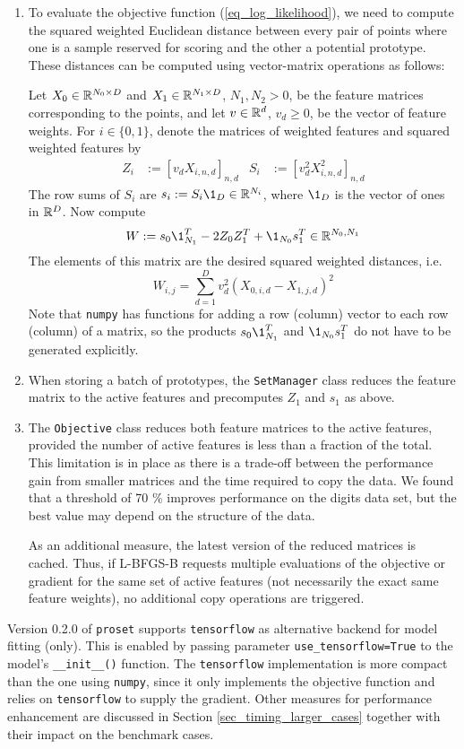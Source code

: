 \begin{enumerate}
\item To evaluate the objective function (\ref{eq_log_likelihood}), we need to compute the squared weighted Euclidean distance between every pair of points where one is a sample reserved for scoring and the other a potential prototype.
These distances can be computed using vector-matrix operations as follows:\par
%
Let $X_0\in\mathbb{R}^{N_0\times D}$ and $X_1\in\mathbb{R}^{N_1\times D}$, $N_1,N_2>0$, be the feature matrices corresponding to the points, and let $v\in\mathbb{R}^d$, $v_d\geq0$, be the vector of feature weights.
For $i\in\{0,1\}$, denote the matrices of weighted features and squared weighted features by
%
\begin{align}
Z_i&:=[v_dX_{i,n,d}]_{n,d}&S_i&:=[v_d^2X_{i,n,d}^2]_{n,d}\label{eq_ZiSi}
\end{align}
%
The row sums of $S_i$ are $s_i:=S_i\1_D\in\R^{N_i}$, where $\1_D$ is the vector of ones in $\mathbb{R}^D$.
Now compute
%
\begin{equation}
W:=s_0\1_{N_1}^T-2Z_0Z_1^T+\1_{N_0}s_1^T\in\R^{N_0,N_1}\label{eq_W}
\end{equation}
%
The elements of this matrix are the desired squared weighted distances, i.e.\
%
\begin{equation}
W_{i,j}=\sum_{d=1}^Dv_d^2(X_{0,i,d}-X_{1,j,d})^2\label{eq_Wij}
\end{equation}
%
Note that \texttt{numpy} has functions for adding a row (column) vector to each row (column) of a matrix, so the products $s_0\1_{N_1}^T$ and $\1_{N_0}s_1^T$ do not have to be generated explicitly.
%
\item When storing a batch of prototypes, the \texttt{SetManager} class reduces the feature matrix to the active features and precomputes $Z_1$ and $s_1$ as above.
%
\item The \texttt{Objective} class reduces both feature matrices to the active features, provided the number of active features is less than a fraction of the total.
This limitation is in place as there is a trade-off between the performance gain from smaller matrices and the time required to copy the data.
We found that a threshold of 70 \% improves performance on the digits data set, but the best value may depend on the structure of the data.\par
%
As an additional measure, the latest version of the reduced matrices is cached.
Thus, if L-BFGS-B requests multiple evaluations of the objective or gradient for the same set of active features (not necessarily the exact same feature weights), no additional copy operations are triggered.
\end{enumerate}
%
Version 0.2.0 of \texttt{proset} supports \texttt{tensorflow} as alternative backend for model fitting (only).
This is enabled by passing parameter \texttt{use\_tensorflow=True} to the model's \texttt{\_\_init\_\_()} function.
The \texttt{tensorflow} implementation is more compact than the one using \texttt{numpy}, since it only implements the objective function and relies on \texttt{tensorflow} to supply the gradient.
Other measures for performance enhancement are discussed in Section \ref{sec_timing_larger_cases} together with their impact on the benchmark cases.
\endinput
